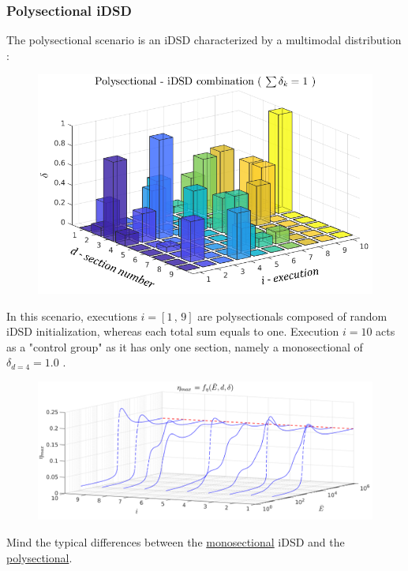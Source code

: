 \documentclass[12pt]{article}
\numberwithin{equation}{section}
\begin{document}
\begin{flushleft}
\subsubsection*{Polysectional iDSD} \label{rand_init}
The polysectional scenario is an iDSD characterized by a multimodal distribution : 
\begin{figure}[H]
\centering
\includegraphics[width=0.745\linewidth, center]{p_comb_poly.png}
\end{figure}
In this scenario, executions $i= [1 \, , \, 9]$ are polysectionals composed of random iDSD initialization, whereas each total sum equals to one. Execution $i=10$ acts as a "control group" as it has only one section, namely a monosectional of $\delta_{d=4} = 1.0$ .
\begin{figure}[H]
\centering
\includegraphics[width=1.15\linewidth, center]{p_dist_poly.png}
\end{figure}
Mind the typical differences between the \underline{monosectional} iDSD and the \underline{polysectional}.


\end{flushleft}
\end{document}
